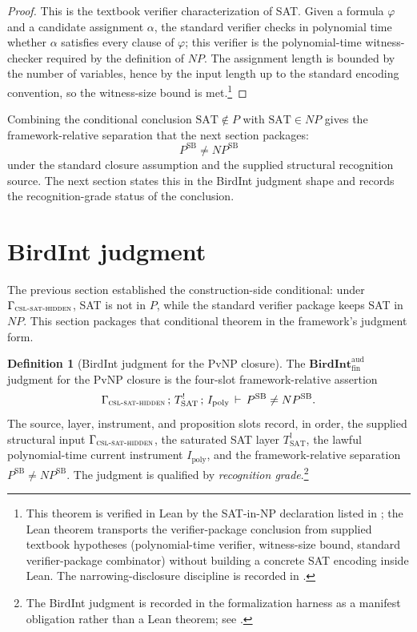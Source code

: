 \documentclass[11pt]{article}
\newcommand{\Tsat}{T^{!}_{\mathrm{SAT}}}
\newcommand{\Ipoly}{I_{\mathrm{poly}}}
\newcommand{\CSLSATHidden}{\Gamma_{\textsc{csl-sat-hidden}}}
\newcommand{\BIJudgment}[4]{#1\,;\,#2\,;\,#3\,\vdash\,#4}
\newcommand{\PSB}{P^{\mathrm{SB}}}
\newcommand{\NPSB}{NP^{\mathrm{SB}}}
\newcommand{\BirdInt}{\mathbf{BirdInt}^{\mathrm{aud}}_{\mathrm{fin}}}
\newcommand{\RecognitionGrade}{\emph{recognition grade}}
\theoremstyle{definition}
\newtheorem{definition}[theorem]{Definition}
\begin{document}
\begin{proof}
This is the textbook verifier characterization of SAT.  Given a
formula \(\varphi\) and a candidate assignment \(\alpha\), the standard
verifier checks in polynomial time whether \(\alpha\) satisfies every
clause of \(\varphi\); this verifier is the polynomial-time
witness-checker required by the definition of \(NP\).  The assignment
length is bounded by the number of variables, hence by the input length
up to the standard encoding convention, so the witness-size bound is
met.\footnote{This theorem is verified in Lean by the SAT-in-NP
declaration listed in ; the Lean theorem
transports the verifier-package conclusion from supplied
textbook hypotheses (polynomial-time verifier, witness-size bound,
standard verifier-package combinator) without building a concrete SAT
encoding inside Lean.  The narrowing-disclosure discipline is recorded
in .}
\end{proof}

Combining the conditional conclusion \(\mathrm{SAT}\notin P\) with
\(\mathrm{SAT}\in NP\) gives the framework-relative separation that
the next section packages:
\[
  \PSB\neq\NPSB
\]
under the standard closure assumption and the supplied structural
recognition source.  The next section states this in the BirdInt
judgment shape and records the recognition-grade status of the
conclusion.
 \section{BirdInt judgment}
\label{sec:judgment}

The previous section established the construction-side conditional:
under \(\CSLSATHidden\), SAT is not in \(P\), while the standard
verifier package keeps SAT in \(NP\).  This section packages that
conditional theorem in the framework's judgment form.

\begin{definition}[BirdInt judgment for the PvNP closure]
\label{def:pvnp:birdint-judgment}
The \(\BirdInt\) judgment for the PvNP closure is the four-slot
framework-relative assertion
\[
  \BIJudgment{\CSLSATHidden}{\Tsat}{\Ipoly}{\PSB \neq \NPSB}.
\]
The source, layer, instrument, and proposition slots record, in order,
the supplied structural input \(\CSLSATHidden\), the saturated SAT
layer \(\Tsat\), the lawful polynomial-time current instrument
\(\Ipoly\), and the framework-relative separation \(\PSB\neq\NPSB\).
The judgment is qualified by \RecognitionGrade{}.\footnote{The BirdInt
judgment is recorded in the formalization harness as a manifest
obligation rather than a Lean theorem; see .}
\end{definition}
\end{document}
